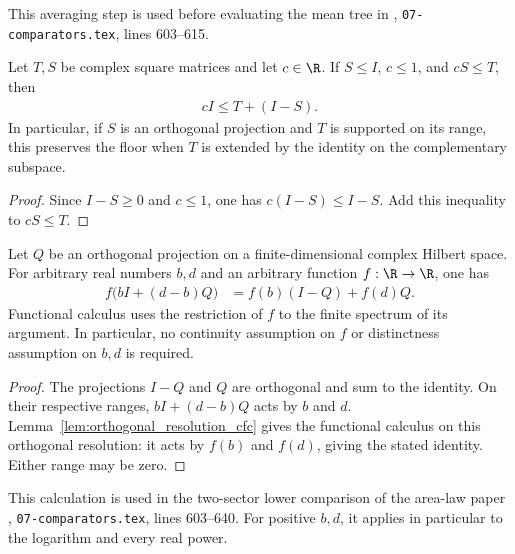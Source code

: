 This averaging step is used before evaluating the mean tree in
\cite[proof of the two-sector lower comparison]{OpenAI2026AreaLaw},
\texttt{07-comparators.tex}, lines 603--615.


\begin{theorem}
    \label{thm:area_law_identity_extension_floor}
    \leanok
    Let $T,S$ be complex square matrices and let $c\in\R$. If
    $S\le I$, $c\le1$, and $cS\le T$, then
    \begin{align}
        cI\le T+(I-S).
    \end{align}
    In particular, if $S$ is an orthogonal projection and $T$ is
    supported on its range, this preserves the floor when $T$ is
    extended by the identity on the complementary subspace.
\end{theorem}

\begin{proof}\leanok
    Since $I-S\ge0$ and $c\le1$, one has $c(I-S)\le I-S$.
    Add this inequality to $cS\le T$.
\end{proof}

\begin{theorem}
    \label{thm:area_law_affine_projection_calculus}
    \leanok
    Let $Q$ be an orthogonal projection on a finite-dimensional complex
    Hilbert space. For arbitrary real numbers $b,d$ and an arbitrary
    function $f:\R\to\R$, one has
    \begin{align}
        f\bigl(bI+(d-b)Q\bigr)
        &=f(b)(I-Q)+f(d)Q.
    \end{align}
    Functional calculus uses the restriction of $f$ to the finite
    spectrum of its argument. In particular, no continuity assumption
    on $f$ or distinctness assumption on $b,d$ is required.
\end{theorem}

\begin{proof}\leanok
    The projections $I-Q$ and $Q$ are orthogonal and sum to the identity.
    On their respective ranges, $bI+(d-b)Q$ acts by $b$ and $d$.
    Lemma~\ref{lem:orthogonal_resolution_cfc} gives the functional
    calculus on this orthogonal resolution: it acts by $f(b)$
    and $f(d)$, giving the stated identity. Either range may be zero.
\end{proof}

This calculation is used in the two-sector lower comparison of the
area-law paper \cite[proof of the two-sector lower comparison]{OpenAI2026AreaLaw},
\texttt{07-comparators.tex}, lines 603--640. For positive
$b,d$, it applies in particular to the logarithm and every real power.

